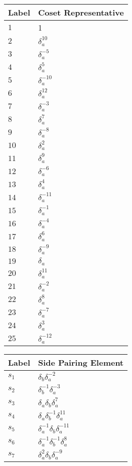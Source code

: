 \documentclass{article}
\begin{document}
\begin{center}
\begin{tabular}{ll}
\toprule
Label & Coset Representative\\
\midrule
$1$ & 1 \\
$2$ & $\delta_a^{10}$ \\
$3$ & $\delta_a^{-5}$ \\
$4$ & $\delta_a^{5}$ \\
$5$ & $\delta_a^{-10}$ \\
$6$ & $\delta_a^{12}$ \\
$7$ & $\delta_a^{-3}$ \\
$8$ & $\delta_a^{7}$ \\
$9$ & $\delta_a^{-8}$ \\
$10$ & $\delta_a^{2}$ \\
$11$ & $\delta_a^{9}$ \\
$12$ & $\delta_a^{-6}$ \\
$13$ & $\delta_a^{4}$ \\
$14$ & $\delta_a^{-11}$ \\
$15$ & $\delta_a^{-1}$ \\
$16$ & $\delta_a^{-4}$ \\
$17$ & $\delta_a^{6}$ \\
$18$ & $\delta_a^{-9}$ \\
$19$ & $\delta_a^{}$ \\
$20$ & $\delta_a^{11}$ \\
$21$ & $\delta_a^{-2}$ \\
$22$ & $\delta_a^{8}$ \\
$23$ & $\delta_a^{-7}$ \\
$24$ & $\delta_a^{3}$ \\
$25$ & $\delta_a^{-12}$ \\
\bottomrule
\end{tabular}
\hfill
\begin{tabular}{ll}
\toprule
Label & Side Pairing Element\\
\midrule
$s_{1}$ & $\delta_b^{}\delta_a^{-2}$ \\
$s_{2}$ & $\delta_b^{-1}\delta_a^{-3}$ \\
$s_{3}$ & $\delta_a^{}\delta_b^{}\delta_a^{7}$ \\
$s_{4}$ & $\delta_a^{}\delta_b^{-1}\delta_a^{11}$ \\
$s_{5}$ & $\delta_a^{-1}\delta_b^{}\delta_a^{-11}$ \\
$s_{6}$ & $\delta_a^{-1}\delta_b^{-1}\delta_a^{8}$ \\
$s_{7}$ & $\delta_a^{2}\delta_b^{}\delta_a^{-9}$ \\

\end{tabular}
\end{center}
\end{document}
